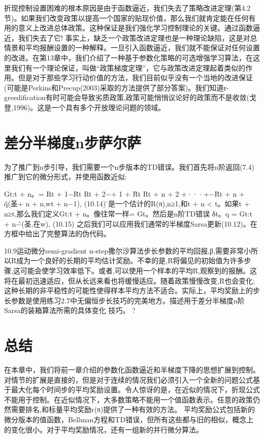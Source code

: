折现控制设置困难的根本原因是由于函数逼近，我们失去了策略改进定理(第4.2节)。如果我们改变政策以提高一个国家的贴现价值，那么我们就肯定能在任何有用的意义上改进总体政策。这种保证是我们强化学习控制理论的关键。通过函数逼近，我们失去了它!
事实上，缺乏一个政策改进定理也是一种理论缺陷，这是对总情景和平均报酬设置的一种解释。一旦引入函数逼近，我们就不能保证对任何设置的改进。在第13章中，我们介绍了一种基于参数化策略的可选增强学习算法，在这里我们有一个理论保证，叫做“政策梯度定理”，它与政策改进定理起着类似的作用。但是对于那些学习行动价值的方法，我们目前似乎没有一个当地的改进保证(可能是Perkins和Precup(2003)采取的方法提供了部分答案)。我们知道ε-greedification有时可能会导致劣质政策,政策可能悄悄议论好的政策而不是收敛(戈登,1996)。这是一个具有多个开放理论问题的领域。

\section{差分半梯度n步萨尔萨}

为了推广到n步引导，我们需要一个n步版本的TD错误。我们首先将n阶返回(7.4)推广到它的微分形式，并使用函数近似:

Gt:t + n。= Rt + 1−R̄t Rt + 2−+ 1 + R̄t Rt + n + 2 +···+−R̄t + n + q̂(圣+ n + n,wt + n−1),
(10.14)
̄是一个估计的R(π),n≥1,和t + n < t。如果t + n≥t,那么我们定义Gt:t + n。像往常一样= Gt。然后是n阶TD错误
δt。q = Gt:t + n−̂(圣,在w), 					(10.15)
之后我们可以应用我们通常的半梯度Sarsa更新(10.12)。在方框中给出了完整算法的伪代码。
 

10.9运动微分semi-gradient n-step撒尔沙算法步长参数的平均回报,β,需要非常小所以R̄成为一个良好的长期的平均估计奖励。不幸的是,R̄将偏见的初始值为许多步骤,这可能会使学习效率低下。或者,可以使用一个样本的平均R̄,观察到的报酬。这将在最初迅速适应，但从长远来看也将缓慢适应。随着政策慢慢改变,R̄也会变化;这种长期的非平稳性的可能性使得样本平均方法不适合。实际上，平均奖励上的步长参数是使用练习2.7中无偏恒步长技巧的完美地方。描述用于差分半梯度n阶Sarsa的装箱算法所需的具体变化
技巧。 					?

\section{总结}

在本章中，我们将前一章介绍的参数化函数逼近和半梯度下降的思想扩展到控制。对情节的扩展是直接的，但是对于连续的情况我们必须引入一个全新的问题公式基于最大化每个时间步的平均奖励设置。令人惊讶的是，在近似的情况下，折现公式不能用于控制。在近似情况下，大多数策略不能用一个值函数表示。任意的政策仍然需要排名,和标量平均奖励r(π)提供了一种有效的方法。
平均奖励公式包括新的微分版本的值函数，Bellman方程和TD错误，但所有这些都与旧的相似，概念上的变化很小。对于平均奖励情况，还有一组新的并行微分算法。



